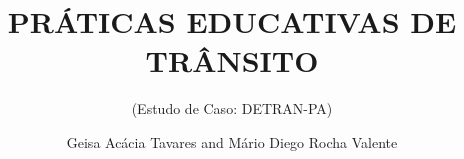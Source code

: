 \title{PRÁTICAS EDUCATIVAS DE TRÂNSITO}
\subtitle{(Estudo de Caso: DETRAN-PA)}
\author{Geisa Acácia Tavares and Mário Diego Rocha Valente} 
 
\renewcommand{\lsISBNdigital}{111-1-111111-11-1}
\renewcommand{\lsISBNhardcover}{111-1-111111-11-1}
\renewcommand{\lsISBNsoftcover}{111-1-111111-11-1}
\renewcommand{\lsISBNsoftcoverus}{111-1-111111-11-1}
\renewcommand{\lsSeries}{cfls} %
\renewcommand{\lsSeriesNumber}{99} %
\renewcommand{\lsURL}{https://github.com/MarioDhiego/Livro_Educacao_Transito_2024}



